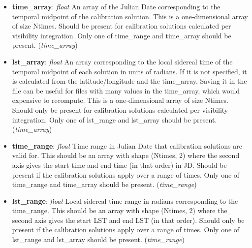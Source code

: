 \documentclass[11pt, oneside]{article}
\begin{document}
\begin{itemize}
\item \textbf{time\_array}: \textit{float} An array of the Julian Date
  corresponding to the temporal midpoint of the calibration solution.
  This is a one-dimensional array of size Ntimes. Should be present
  for calibration solutions calculated per visibility integration.
  Only one of time\_range and time\_array should be present.  (\textit{time\_array})
\item \textbf{lst\_array}: \textit{float} An array corresponding to the local
  sidereal time of the temporal midpoint of each solution in units of
  radians. If it is not specified, it is calculated from the latitude/longitude
  and the time\_array. Saving it in the file can be useful for files with many
  values in the time\_array, which would expensive to
  recompute. This is a one-dimensional array of size Ntimes. Should only
  be present for calibration solutions calculated per visibility integration.
  Only one of lst\_range and lst\_array should be present.  (\textit{time\_array})
\item \textbf{time\_range}: \textit{float} Time range in Julian Date that calibration
  solutions are valid for. This should be an array with shape (Ntimes, 2) where
  the second axis gives the start time and end time (in that order) in JD. Should
  be present if the calibration solutions apply over a range of times.
  Only one of time\_range and time\_array should be present. (\textit{time\_range})
\item \textbf{lst\_range}: \textit{float} Local sidereal time range in radians corresponding
  to the time\_range. This should be an array with shape (Ntimes, 2) where
  the second axis gives the start LST and end LST (in that order). Should only
  be present if the calibration solutions apply over a range of times.
  Only one of lst\_range and lst\_array should be present. (\textit{time\_range})


\end{itemize}
\end{document}
